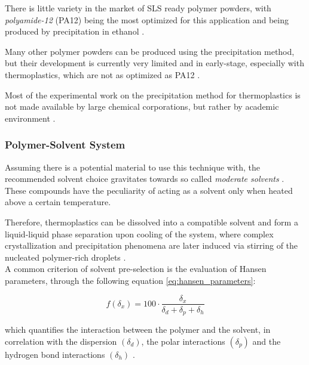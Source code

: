 \documentclass[a4paper]{article}
\begin{document}
    There is little variety in the market of SLS ready polymer powders, with \textit{polyamide-12} (PA12) being the most optimized for this 
    application and being produced by precipitation in ethanol \autocite*{DechetMaximilianA2020OtDo}.
    
    Many other polymer powders can be produced using the precipitation method, but their development is currently very limited 
    and in early-stage, especially with thermoplastics, which are not as optimized as PA12 \autocites{Kovalcik_PHA_Review}.
    
    Most of the experimental work on the precipitation method for thermoplastics is not made available by large chemical corporations, 
    but rather by academic environment \autocites{Kovalcik_PHA_Review}. 

    \subsubsection{Polymer-Solvent System \label{polymer_solvent_system}}

    Assuming there is a potential material to use this technique with, the recommended solvent choice gravitates towards 
    so called \textit{moderate solvents} \autocite*{DechetMaximilianA2020OtDo}. \\
    
    These compounds have the peculiarity of acting as a solvent only when heated above a certain temperature. 

    Therefore, thermoplastics can be dissolved into a compatible solvent and form a liquid-liquid phase separation
    upon cooling of the system, where complex crystallization and precipitation phenomena are later induced via stirring of 
    the nucleated polymer-rich droplets \autocite*{DechetMaximilianA2020OtDo}.  \\ 

    A common criterion of solvent pre-selection is the evaluation of Hansen parameters, through the following equation \ref{eq:hansen_parameters}: 

    \begin{equation}
        \textit{f} (\delta_x) = 100 \cdot \frac{\delta_x}{\delta_d + \delta_p + \delta_h}
        \label{eq:hansen_parameters}
    \end{equation}

    which quantifies the interaction between the polymer and the solvent, in correlation with the dispersion $(\delta_d)$, 
    the polar interactions $(\delta_p)$ and the hydrogen bond interactions $(\delta_h)$ \autocite*{DechetMaximilianA2020OtDo}. 
\end{document}
